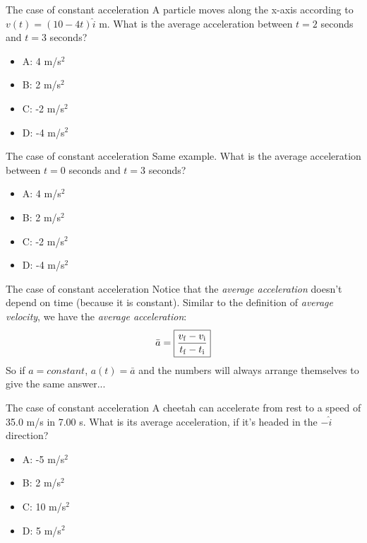 \documentclass{beamer}
\begin{document}
\begin{frame}{The case of constant acceleration}
A particle moves along the x-axis according to $v(t) = (10-4t)\hat{i}$ m.  What is the average acceleration
between $t=2$ seconds and $t=3$ seconds?
\begin{itemize}
\item A: 4 m/s$^2$
\item B: 2 m/s$^2$
\item C: -2 m/s$^2$
\item D: -4 m/s$^2$
\end{itemize}
\end{frame}

\begin{frame}{The case of constant acceleration}
Same example.  What is the average acceleration between $t=0$ seconds and $t=3$ seconds?
\begin{itemize}
\item A: 4 m/s$^2$
\item B: 2 m/s$^2$
\item C: -2 m/s$^2$
\item D: -4 m/s$^2$
\end{itemize}
\end{frame}

\begin{frame}{The case of constant acceleration}
Notice that the \textit{average acceleration} doesn't depend on time (because it is constant).  Similar to the definition of \textit{average velocity}, we have the \textit{average acceleration}:\\
\begin{equation}
\bar{a} = \boxed{\frac{v_{\rm f} - v_{\rm i}}{t_{\rm f} - t_{\rm i}}}
\end{equation}
So if $a = constant$, $a(t) = \bar{a}$ and the numbers will always arrange themselves to give the same answer...
\end{frame}

\begin{frame}{The case of constant acceleration}
A cheetah can accelerate from rest to a speed of 35.0 m/s in 7.00 s. What is its average acceleration, if it's headed in the $-\hat{i}$ direction?
\begin{itemize}
\item A: -5 m/s$^2$
\item B: 2 m/s$^2$
\item C: 10 m/s$^2$
\item D: 5 m/s$^2$
\end{itemize}
\end{frame}
\end{document}
